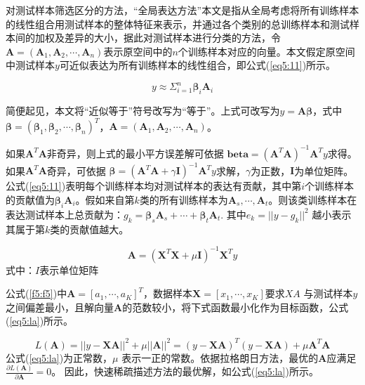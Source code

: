 对测试样本筛选区分的方法，“全局表达方法”本文是指从全局考虑将所有训练样本的线性组合用测试样本的整体特征来表示，并通过各个类别的总训练样本和测试样本间的加权及差异的大小，据此对测试样本进行分类的方法，令$\boldsymbol{A} =  ( \boldsymbol{A}_1,\boldsymbol{A}_2,\cdots,\boldsymbol{A}_n )$表示原空间中的$n$个训练样本对应的向量。本文假定原空间中测试样本$y$可近似表达为所有训练样本的线性组合，即公式(\ref{eq5:11})所示。

\begin{equation}
\label{eq5:11}
y \approx \Sigma _{i=1}^n \boldsymbol{\beta}_i \boldsymbol{A}_i
\end{equation}

简便起见，本文将“近似等于”符号改写为“等于”。上式可改写为$ y = \boldsymbol{A\beta}$，式中$\boldsymbol{\beta}=(\boldsymbol{\beta}_1, \boldsymbol{\beta}_2,\cdots,\boldsymbol{\beta}_n )^T$，$\boldsymbol{A} =( \boldsymbol{A}_1,\boldsymbol{A}_2,\cdots,\boldsymbol{A}_n)$。

如果$\boldsymbol{A}^T \boldsymbol{A}$非奇异，则上式的最小平方误差解可依据 $\boldsymbol{beta}=(\boldsymbol{A}^T \boldsymbol{A})^{-1} \boldsymbol{A}^T y$求得。如果$\boldsymbol{A}^T\boldsymbol{A}$奇异，可依据 $\boldsymbol{\beta}=(\boldsymbol{A}^T \boldsymbol{A}+\gamma \boldsymbol{I})^{-1} \boldsymbol{A}^T y$求解，$\gamma $为正数，$\boldsymbol{I}$为单位矩阵。公式(\ref{eq5:11})表明每个训练样本均对测试样本的表达有贡献，其中第$i$个训练样本的贡献值为$\boldsymbol{\beta}_i \boldsymbol{A}_i$。假如来自第$k$类的所有训练样本为$\boldsymbol{A}_s,\cdots,\boldsymbol{A}_t$。则该类训练样本在表达测试样本上总贡献为：$g_k = \boldsymbol{\beta}_s \boldsymbol{A}_s+ \cdots +\boldsymbol{\beta}_t \boldsymbol{A}_t$. 其中$e_k = ||y -g_k ||^2$ 越小表示其属于第$k$类的贡献值越大。

\begin{equation}
\label{eq5:a}
\boldsymbol{A}=(\boldsymbol{X}^T \boldsymbol{X}+\mu \boldsymbol{I}) ^{-1} \boldsymbol{X}^T y
\end{equation}
式中：$I$表示单位矩阵

公式(\ref{f5:f5})中$ \boldsymbol{A}=[a_1,\cdots, a_K]^T$，数据样本$ \boldsymbol{X} =[x_1, \cdots , x_K]$要求$XA$ 与测试样本$y$之间偏差最小，且解向量$\boldsymbol{A}$的范数较小，将下式函数最小化作为目标函数，公式(\ref{eq5:la})所示。

\begin{equation}
\label{eq5:la}
L(\boldsymbol{A})=||y-\boldsymbol{XA}||^2 + \mu ||\boldsymbol{A}||^2 =(y-\boldsymbol{XA})^T(y-\boldsymbol{XA})+ \mu \boldsymbol{A}^T\boldsymbol{A}
\end{equation}
公式(\ref{eq5:la})为正常数，$\mu$ 表示一正的常数。依据拉格朗日方法，最优的$\boldsymbol{A}$应满足${\frac {\partial L(\boldsymbol{A})}{\partial \boldsymbol{A}}} = 0$。 因此，快速稀疏描述方法的最优解，如公式(\ref{eq5:la})所示。

